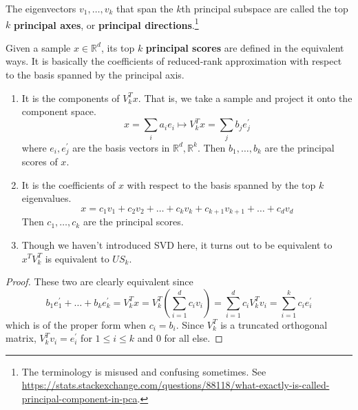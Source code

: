   \begin{definition}
    The eigenvectors $v_1, \ldots, v_k$ that span the $k$th principal subspace are called the top $k$ \textbf{principal axes}, or \textbf{principal directions}.\footnote{The terminology is misused and confusing sometimes. See \href{https://stats.stackexchange.com/questions/88118/what-exactly-is-called-principal-component-in-pca}{https://stats.stackexchange.com/questions/88118/what-exactly-is-called-principal-component-in-pca}.} 
  \end{definition} 
  
  \begin{definition}
    Given a sample $x \in \mathbb{R}^d$, its top $k$ \textbf{principal scores} are defined in the equivalent ways. It is basically the coefficients of reduced-rank approximation with respect to the basis spanned by the principal axis. 
    \begin{enumerate}
      \item It is the components of $V_k^T x$. That is, we take a sample and project it onto the component space. 
      \begin{equation}
        x = \sum_i a_i e_i \mapsto V_k^T x = \sum_j b_j e_j^
        \prime
      \end{equation} 
      where $e_i, e_j^\prime$ are the basis vectors in $\mathbb{R}^d, \mathbb{R}^k$. Then $b_1, \ldots, b_k$ are the principal scores of $x$. 

      \item It is the coefficients of $x$ with respect to the basis spanned by the top $k$ eigenvalues. 
      \begin{equation}
        x = c_1 v_1 + c_2 v_2 + \ldots + c_k v_k + c_{k+1} v_{k+1} + \ldots + c_d v_d
      \end{equation} 
      Then $c_1, \ldots, c_k$ are the principal scores. 

      \item Though we haven't introduced SVD here, it turns out to be equivalent to $x^T V_k^T$ is equivalent to $US_k$. 
    \end{enumerate}
  \end{definition}
  \begin{proof}
    These two are clearly equivalent since 
    \begin{equation}
      b_1 e_1^\prime + \ldots + b_k e_k^\prime = V_k^T x = V_k^T \left( \sum_{i=1}^d c_i v_i \right) = \sum_{i=1}^d c_i V_k^T v_i = \sum_{i=1}^k c_i e_i^\prime 
    \end{equation} 
    which is of the proper form when $c_i = b_i$. Since $V_k^T$ is a truncated orthogonal matrix, $V_k^T v_i = e_i^\prime$ for $1 \leq i \leq k$ and $0$ for all else. 
  \end{proof}

